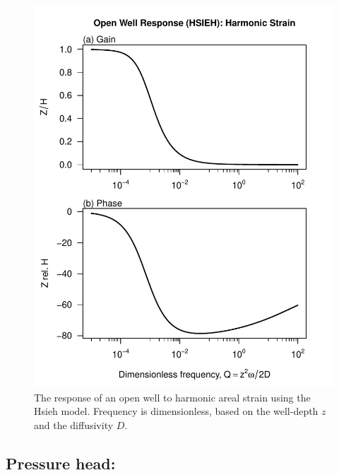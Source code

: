 \documentclass[12pt]{article}\usepackage[]{graphicx}\usepackage[]{color}
\makeatletter
\def\maxwidth{ %
  \ifdim\Gin@nat@width>\linewidth
    \linewidth
  \else
    \Gin@nat@width
  \fi
}
\newenvironment{knitrout}{}{} %
\makeatother
\begin{document}
\begin{figure}[htb!]
\begin{center}
\begin{knitrout}\small
{}\color{fgcolor}
\includegraphics[width=\maxwidth]{figure/HSIEHRESPFIG} 

\end{knitrout}

\caption{The response of an open well to harmonic areal strain using
the Hsieh model. 
Frequency is dimensionless, based on the well-depth $z$ and the diffusivity $D$.
}
\label{fig:owrsp-hsi}
\end{center}
\end{figure}

\clearpage
\subsection{Pressure head: \citet{liu1989}}
\end{document}
